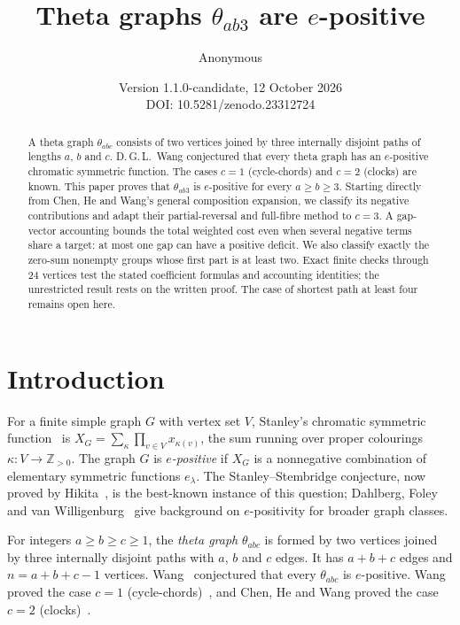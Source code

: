 \documentclass[11pt]{article}
\title{Theta graphs $\theta_{ab3}$ are $e$-positive}
\author{Anonymous}
\date{Version 1.1.0-candidate, 12 October 2026\\\small DOI: 10.5281/zenodo.23312724}
\theoremstyle{remark}
\theoremstyle{definition}
\begin{document}
\maketitle

\begin{abstract}
A theta graph $\theta_{abc}$ consists of two vertices joined by three internally disjoint paths of lengths $a$, $b$ and $c$. D.\,G.\,L.~Wang conjectured that every theta graph has an $e$-positive chromatic symmetric function. The cases $c=1$ (cycle-chords) and $c=2$ (clocks) are known. This paper proves that $\theta_{ab3}$ is $e$-positive for every $a\ge b\ge3$. Starting directly from Chen, He and Wang's general composition expansion, we classify its negative contributions and adapt their partial-reversal and full-fibre method to $c=3$. A gap-vector accounting bounds the total weighted cost even when several negative terms share a target: at most one gap can have a positive deficit. We also classify exactly the zero-sum nonempty groups whose first part is at least two. Exact finite checks through $24$ vertices test the stated coefficient formulas and accounting identities; the unrestricted result rests on the written proof. The case of shortest path at least four remains open here.
\end{abstract}

\section{Introduction}

For a finite simple graph $G$ with vertex set $V$, Stanley's chromatic symmetric function~\cite{Stanley1995} is $X_G=\sum_\kappa\prod_{v\in V}x_{\kappa(v)}$, the sum running over proper colourings $\kappa\colon V\to\mathbb{Z}_{>0}$. The graph $G$ is \emph{$e$-positive} if $X_G$ is a nonnegative combination of elementary symmetric functions $e_\lambda$. The Stanley--Stembridge conjecture, now proved by Hikita~\cite{Hikita2024}, is the best-known instance of this question; Dahlberg, Foley and van Willigenburg~\cite{DFvW2017} give background on $e$-positivity for broader graph classes.

For integers $a\ge b\ge c\ge 1$, the \emph{theta graph} $\theta_{abc}$ is formed by two vertices joined by three internally disjoint paths with $a$, $b$ and $c$ edges. It has $a+b+c$ edges and $n=a+b+c-1$ vertices. Wang~\cite[Conjecture~4.1]{Wang2024cyclechords} conjectured that every $\theta_{abc}$ is $e$-positive. Wang proved the case $c=1$ (cycle-chords)~\cite{Wang2024cyclechords}, and Chen, He and Wang proved the case $c=2$ (clocks)~\cite{ChenHeWang2024}.
\end{document}
